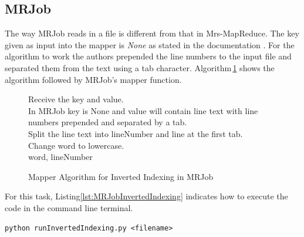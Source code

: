 \documentclass[10pt, twocolumn]{article}
\makeatletter
\newcommand{\removelatexerror}{\let\@latex@error\@gobble}
\makeatother
\begin{document}
\subsection{MRJob}
%
The way MRJob reads in a file is different from that in Mrs-MapReduce. The key given as input into the mapper is \emph{None} as stated in the documentation \cite{ELEN4020A_REF:MRJob067}. For the algorithm to work the authors prepended the line numbers to the input file and separated them from the text using a tab character. Algorithm\,\ref*{Alg:MapperMRJobInvertedIndexing} shows the algorithm followed by MRJob's mapper function.
%
\begin{figure}[H]
     \removelatexerror
    \begin{algorithm}[H]
       \label{Alg:MapperMRJobInvertedIndexing}
        \caption{Mapper Algorithm for Inverted Indexing in MRJob}
        Receive the key and value.\\
        In MRJob key is None and value will contain line text with line numbers prepended and separated by a tab.\\
        Split the line text into lineNumber and line at the first tab.\\
        {   
            Change word to lowercase.\\
            {
                \Return word, lineNumber
            }
        }
    \end{algorithm}
\end{figure}
%
For this task, Listing\ref*{lst:MRJobInvertedIndexing} indicates how to execute the code in the command line terminal.
%
\begin{center}
\begin{minipage}{0.99\columnwidth}
\begin{lstlisting}[style=bashStyle, label=lst:MRJobInvertedIndexing, caption = Command to execute Inverted Indexing using MRJob]
python runInvertedIndexing.py <filename>
\end{lstlisting}
\end{minipage}
\end{center}
%
%
%
\end{document}
